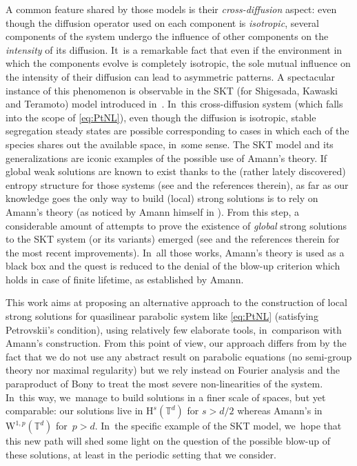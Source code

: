 \documentclass[10pt]{amsart}
\theoremstyle{definition}
\newcommand\T{\mathbb{T}}
\renewcommand\H{\mathrm{H}}
\newcommand\W{\mathrm{W}}
\begin{document}
A common feature shared by those models is their \emph{cross-diffusion} aspect: even though the diffusion operator used on each component is \emph{isotropic}, several components of the system undergo the influence of other components on the \emph{intensity} of its diffusion. It~is a remarkable fact that even if the environment in which the components evolve is completely isotropic, the sole mutual influence on the intensity of their diffusion can lead to asymmetric patterns. A spectacular instance of this phenomenon is observable in the SKT (for Shigesada, Kawaski and Teramoto) model introduced in~\cite{skt}. In~this cross-diffusion system (which falls into the scope of \eqref{eq:PtNL}), even though the diffusion is isotropic, stable segregation steady states are possible corresponding to cases in which each of the species shares out the available space, in~some sense. The SKT model and its generalizations are iconic examples of the possible use of Amann's theory. If global weak solutions are known to exist thanks to the (rather lately discovered) entropy structure for those systems (see \cite{chen_jun,dlmt} and the references therein), as far as our knowledge goes the only way to build (local) strong solutions is to rely on Amann's theory (as noticed by Amann himself in \cite{amann}). From this step, a considerable amount of attempts to prove the existence of \emph{global} strong solutions to the SKT system (or its variants) emerged (see \cite{HNP,GMT} and the references therein for the most recent improvements). In~all those works, Amann's theory is used as a black box and the quest is reduced to the denial of the blow-up criterion which holds in case of finite lifetime, as established by Amann.

This work aims at proposing an alternative approach to the construction of local strong solutions for quasilinear parabolic system like \eqref{eq:PtNL} (satisfying Petrovskii's condition), using relatively few elaborate tools, in~comparison with Amann's construction. From this point of view, our approach differs from \cite{amann} by the fact that we do not use any abstract result on parabolic equations (no semi-group theory nor maximal regularity) but we rely instead on Fourier analysis and the paraproduct of Bony \cite{bony} to treat the most severe non-linearities of the system. In~this way, we~manage to build solutions in a finer scale of spaces, but yet comparable: our solutions live in $\H^s(\T^d)$ for $s>d/2$ whereas Amann's in $\W^{1,p}(\T^d)$ for~$p>d$. In~the specific example of the SKT model, we~hope that this new path will shed some light on the question of the possible blow-up of these solutions, at least in the periodic setting that we consider.
\end{document}
